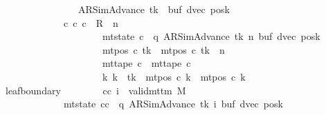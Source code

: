 \begin{isabellebody}
\ \ \ \ \ \ \ \ \ \ \ \ \ \ \ \ \ \ \ \ \ \ {\isacharparenleft}{\kern0pt}AR{\isacharunderscore}{\kern0pt}SimAdvance{\isacharcomma}{\kern0pt}\ tk{\isacharcomma}{\kern0pt}\ {}{\isacharcomma}{\kern0pt}\ buf{\isacharcomma}{\kern0pt}\ dvec{\isacharcomma}{\kern0pt}\ posk{\isacharparenright}{\kern0pt}\ {\isasymrbrakk}\isanewline
\ \ \ \ \ \ \ \ \ \ \ \ \ \ \ \ \ \ {\isasymLongrightarrow}\ {\isasymexists}c{\isacharprime}{\kern0pt}{\isachardot}{\kern0pt}\ {\isacharparenleft}{\kern0pt}c{}{\isacharprime}{\kern0pt}{\isacharcomma}{\kern0pt}\ c{\isacharprime}{\kern0pt}{\isacharparenright}{\kern0pt}\ {\isasymin}\ R{\isacharprime}{\kern0pt}\ {\isacharcircum}{\kern0pt}{\isacharcircum}{\kern0pt}\ n\isanewline
\ \ \ \ \ \ \ \ \ \ \ \ \ \ \ \ \ \ \ \ \ \ \ \ \ \ {\isasymand}\ mt{\isacharunderscore}{\kern0pt}state\ c{\isacharprime}{\kern0pt}\ {\isacharequal}{\kern0pt}\ {\isacharparenleft}{\kern0pt}q{\isacharcomma}{\kern0pt}\ AR{\isacharunderscore}{\kern0pt}SimAdvance{\isacharcomma}{\kern0pt}\ tk{\isacharcomma}{\kern0pt}\ n{\isacharcomma}{\kern0pt}\ buf{\isacharcomma}{\kern0pt}\ dvec{\isacharcomma}{\kern0pt}\ posk{\isacharparenright}{\kern0pt}\isanewline
\ \ \ \ \ \ \ \ \ \ \ \ \ \ \ \ \ \ \ \ \ \ \ \ \ \ {\isasymand}\ mt{\isacharunderscore}{\kern0pt}pos\ c{\isacharprime}{\kern0pt}\ tk\ {\isacharequal}{\kern0pt}\ mt{\isacharunderscore}{\kern0pt}pos\ c{}{\isacharprime}{\kern0pt}\ tk\ {\isacharminus}{\kern0pt}\ n\isanewline
\ \ \ \ \ \ \ \ \ \ \ \ \ \ \ \ \ \ \ \ \ \ \ \ \ \ {\isasymand}\ mt{\isacharunderscore}{\kern0pt}tape\ c{\isacharprime}{\kern0pt}\ {\isacharequal}{\kern0pt}\ mt{\isacharunderscore}{\kern0pt}tape\ c{}{\isacharprime}{\kern0pt}\isanewline
\ \ \ \ \ \ \ \ \ \ \ \ \ \ \ \ \ \ \ \ \ \ \ \ \ \ {\isasymand}\ {\isacharparenleft}{\kern0pt}{\isasymforall}k{\isacharprime}{\kern0pt}{\isachardot}{\kern0pt}\ k{\isacharprime}{\kern0pt}\ {\isasymnoteq}\ tk\ {\isasymlongrightarrow}\ mt{\isacharunderscore}{\kern0pt}pos\ c{\isacharprime}{\kern0pt}\ k{\isacharprime}{\kern0pt}\ {\isacharequal}{\kern0pt}\ mt{\isacharunderscore}{\kern0pt}pos\ c{}{\isacharprime}{\kern0pt}\ k{\isacharprime}{\kern0pt}{\isacharparenright}{\kern0pt}{\isachardoublequoteclose}\isanewline
\ \ \ \ \ \ \ leaf{\isacharunderscore}{\kern0pt}boundary{\isacharcolon}{\kern0pt}\isanewline
\ \ \ \ \ \ \ \ {\isachardoublequoteopen}{\isasymAnd}cc\ i{\isachardot}{\kern0pt}\ {\isasymlbrakk}\ valid{\isacharunderscore}{\kern0pt}mttm\ M{\isacharsemicolon}{\kern0pt}\isanewline
\ \ \ \ \ \ \ \ \ \ \ \ \ \ \ \ \ \ \ mt{\isacharunderscore}{\kern0pt}state\ cc\ {\isacharequal}{\kern0pt}\ {\isacharparenleft}{\kern0pt}q{\isacharcomma}{\kern0pt}\ AR{\isacharunderscore}{\kern0pt}SimAdvance{\isacharcomma}{\kern0pt}\ tk{\isacharcomma}{\kern0pt}\ i{\isacharcomma}{\kern0pt}\ buf{\isacharcomma}{\kern0pt}\ dvec{\isacharcomma}{\kern0pt}\ posk{\isacharparenright}{\kern0pt}{\isacharsemicolon}{\kern0pt}\isanewline

\end{isabellebody}

